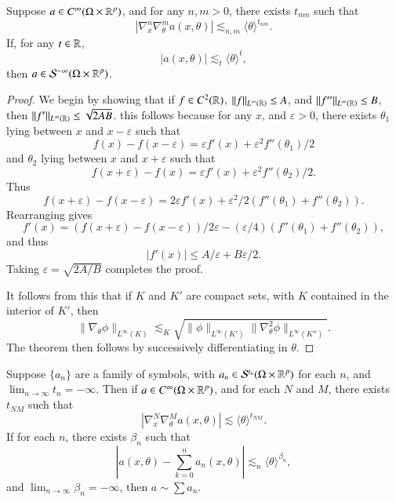 \begin{lemma}
    Suppose $a \in C^\infty(\Omega \times \operatorname{\mathbb{R}}^p)$, and for any $n,m > 0$, there exists $t_{nm}$ such that
    \[ |\nabla^n_x \nabla^m_\theta a(x,\theta)| \lesssim_{n,m} \langle \theta \rangle^{t_{nm}}. \]
    If, for any $t \in \operatorname{\mathbb{R}}$,
    \[ |a(x,\theta)| \lesssim_t \langle \theta \rangle^t, \]
    then $a \in \mathcal{S}^{-\infty}(\Omega \times \operatorname{\mathbb{R}}^p)$.
\end{lemma}
\begin{proof}
    We begin by showing that if $f \in C^2(\operatorname{\mathbb{R}})$, $\| f \|_{L^\infty(\operatorname{\mathbb{R}})} \leq A$, and $\| f'' \|_{L^\infty(\operatorname{\mathbb{R}})} \leq B$, then $\| f' \|_{L^\infty(\operatorname{\mathbb{R}})} \leq \sqrt{2AB}$. this follows because for any $x$, and $\varepsilon > 0$, there exists $\theta_1$ lying between $x$ and $x - \varepsilon$ such that
    \[ f(x) - f(x-\varepsilon) = \varepsilon f'(x) + \varepsilon^2 f''(\theta_1) / 2 \]
    and $\theta_2$ lying between $x$ and $x + \varepsilon$ such that
    \[ f(x + \varepsilon) - f(x) = \varepsilon f'(x) + \varepsilon^2 f''(\theta_2)/2. \]
    Thus
    \[ f(x+\varepsilon) - f(x-\varepsilon) = 2 \varepsilon f'(x) + \varepsilon^2 / 2 (f''(\theta_1) + f''(\theta_2)). \]
    Rearranging gives
    \[ f'(x) = (f(x+\varepsilon) - f(x-\varepsilon))/2 \varepsilon - (\varepsilon / 4)(f''(\theta_1) + f''(\theta_2)), \]
    and thus
    \[ |f'(x)| \leq A/\varepsilon + B \varepsilon / 2. \]
    Taking $\varepsilon = \sqrt{2A/B}$ completes the proof.

    It follows from this that if $K$ and $K'$ are compact sets, with $K$ contained in the interior of $K'$, then
    \[ \| \nabla_\theta \phi \|_{L^\infty(K)} \lesssim_K \sqrt{\| \phi \|_{L^\infty(K')} \| \nabla_\theta^2 \phi \|_{L^\infty(K'')} }. \]
    The theorem then follows by successively differentiating in $\theta$.
\end{proof}

\begin{corollary}
    Suppose $\{ a_n \}$ are a family of symbols, with $a_n \in \mathcal{S}^{t_n}(\Omega \times \operatorname{\mathbb{R}}^p)$ for each $n$, and $\lim_{n \to \infty} t_n = -\infty$. Then if $a \in C^\infty(\Omega \times \operatorname{\mathbb{R}}^p)$, and for each $N$ and $M$, there exists $t_{NM}$ such that
    \[ |\nabla^N_x \nabla^M_\theta a(x,\theta)| \lesssim \langle \theta \rangle^{t_{NM}}. \]
    If for each $n$, there exists $\beta_n$ such that
    \[ |a(x,\theta) - \sum_{k = 0}^n a_n(x,\theta)| \lesssim_n \langle \theta \rangle^{\beta_n}, \]
    and $\lim_{n \to \infty} \beta_n = -\infty$, then $a \sim \sum a_n$.
\end{corollary}

